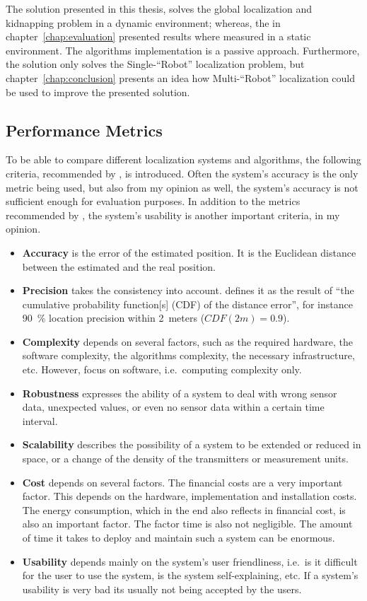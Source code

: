 \noindent The solution presented in this thesis, solves the global localization and kidnapping problem in a dynamic environment; whereas, the in chapter~\ref{chap:evaluation} presented results where measured in a static environment. The algorithms implementation is a passive approach. Furthermore, the solution only solves the Single-``Robot'' localization problem, but chapter~\ref{chap:conclusion} presents an idea how Multi-``Robot'' localization could be used to improve the presented solution.

\subsection{Performance Metrics}
To be able to compare different localization systems and algorithms, the following criteria, recommended by \citet{IEEE:survey_wireless_indoor_pos}, is introduced. Often the system's accuracy is the only metric being used, but also from my opinion as well, the system's accuracy is not sufficient enough for evaluation purposes. In addition to the metrics recommended by \citet{IEEE:survey_wireless_indoor_pos}, the system's usability is another important criteria, in my opinion.
\begin{itemize}
	\item \textbf{Accuracy} is the error of the estimated position. It is the Euclidean distance between the estimated and the real position.
	\item \textbf{Precision} takes the consistency into account. \citet{IEEE:survey_wireless_indoor_pos} defines it as the result of ``the cumulative probability function[s] (CDF) of the distance error'', for instance 90~\% location precision within 2~meters ($CDF(2m) = 0.9$).
	\item \textbf{Complexity} depends on several factors, such as the required hardware, the software complexity, the algorithms complexity, the necessary infrastructure, etc. However, \citet{IEEE:survey_wireless_indoor_pos} focus on software, i.e.\ computing complexity only.
	\item \textbf{Robustness} expresses the ability of a system to deal with wrong sensor data, unexpected values, or even no sensor data within a certain time interval.
	\item \textbf{Scalability} describes the possibility of a system to be extended or reduced in space, or a change of the density of the transmitters or measurement units.
	\item \textbf{Cost} depends on several factors. The financial costs are a very important factor. This depends on the hardware, implementation and installation costs. The energy consumption, which in the end also reflects in financial cost, is also an important factor. The factor time is also not negligible. The amount of time it takes to deploy and maintain such a system can be enormous.
	\item \textbf{Usability} depends mainly on the system's user friendliness, i.e.\ is it difficult for the user to use the system, is the system self-explaining, etc. If a system's usability is very bad its usually not being accepted by the users.
\end{itemize}

